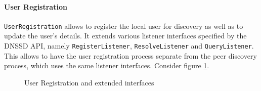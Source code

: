 \paragraph{User Registration}
 \texttt{UserRegistration} allows to register the local user for discovery as well as to update the user's details. It extends 
 various listener interfaces specified by the DNSSD API, namely  \texttt{RegisterListener},  \texttt{ResolveListener} and  \texttt{QueryListener}. This allows to have the user registration process separate from the peer discovery process, which uses the same listener interfaces. Consider figure \ref{fig:network.discovery.userregistration}.

\begin{figure}[H]
 \centering
 \caption{User Registration and extended interfaces}
 \label{fig:network.discovery.userregistration}
\end{figure}


